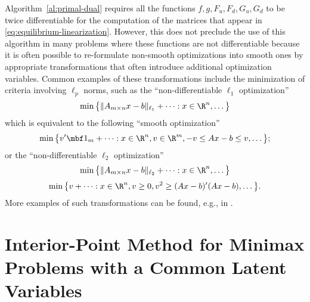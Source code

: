 \documentclass[11pt]{article}
\begin{document}
\begin{remark}[Smoothness]
  Algorithm~\ref{al:primal-dual} requires all the functions
  $f,g,F_u,F_d,G_u,G_d$ to be twice differentiable for the computation
  of the matrices that appear in
  \eqref{eq:equilibrium-linearization}. However, this does not
  preclude the use of this algorithm in many problems where these
  functions are not differentiable because it is often possible to
  re-formulate non-smooth optimizations into smooth ones by
  appropriate transformations that often introduce additional
  optimization variables. Common examples of these transformations
  include the minimization of criteria involving $\ell_p$ norms, such as
  the ``non-differentiable $\ell_1$ optimization''
  \begin{align*}
    \min \big\{ \|A_{m\times n}x-b\|_{\ell_1}+\cdots: x\in\R^n,\dots \big\}
  \end{align*}
  which is equivalent to the following ``smooth optimization''
  \begin{align*}
    \min \big\{v'\mbf 1_m +\cdots:x\in\R^n,v\in\R^m, -v\le Ax-b\le v,\dots\big\};
  \end{align*}
  or the ``non-differentiable $\ell_2$ optimization''
  \begin{align*}
    \min \big\{\|A_{m\times n}x-b\|_{\ell_2}+\cdots: x\in\R^n,\dots\big\}
  \end{align*}
  \begin{align*}
    \min \big\{v +\cdots:x\in\R^n,v\ge0, v^2\ge (Ax-b)'(Ax-b),\dots \big\}.
  \end{align*}
  More examples of such transformations can be found, e.g., in
  \cite{GrantBoyd2008}. \frqed
\end{remark}

\section{Interior-Point Method for Minimax Problems with a Common Latent Variables}
\label{sec:ipm-latent}
\end{document}
